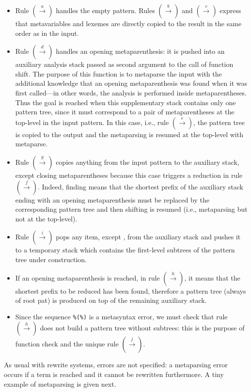 \begin{itemize}

  \item Rule \((\xrightarrow{a})\) handles the empty pattern. Rules
    \((\xrightarrow{b})\) and \((\xrightarrow{c})\) express that
    meta\-variables and lexemes are directly copied to the result in
    the same order as in the input.

  \item Rule \((\xrightarrow{d})\) handles an opening
    meta\-parenthesis: it is pushed into an auxiliary analysis stack
    passed as second argument to the call of function
    \textsf{shift}. The purpose of this function is to metaparse the
    input with the additional knowledge that an opening
    meta\-parenthesis was found when it was first called---in other
    words, the analysis is performed inside meta\-parentheses. Thus
    the goal is reached when this supplementary stack contains only
    one pattern tree, since it must correspond to a pair of
    meta\-parentheses at the top\hyp{}level in the input pattern. In
    this case, i.e., rule \((\xrightarrow{e})\), the pattern tree is
    copied to the output and the meta\-parsing is resumed at the
    top\hyp{}level with \textsf{metaparse}.

  \item Rule \((\xrightarrow{g})\) copies anything from the input
    pattern to the auxiliary stack, except closing meta\-parentheses
    because this case triggers a reduction in rule
    \((\xrightarrow{f})\). Indeed, finding \mrp means that the
    shortest prefix of the auxiliary stack ending with an opening
    meta\-parenthesis must be replaced by the corresponding pattern
    tree and then shifting is resumed (i.e., meta\-parsing but not at
    the top\hyp{}level). 

  \item Rule \((\xrightarrow{i})\) pops any item, except \mlp, from
    the auxiliary stack and pushes it to a temporary stack which
    contains the first\hyp{}level subtrees of the pattern tree under
    construction.

  \item If an opening meta\-parenthesis is reached, in rule
    \((\xrightarrow{h})\), it means that the shortest prefix to be
    reduced has been found, therefore a pattern tree (always of root
    \textsf{pat}) is produced on top of the remaining auxiliary stack.

    \item Since the sequence \texttt{\%(\%)} is a meta\-syntax error,
      we must check that rule \((\xrightarrow{h})\) does not build a
      pattern tree without subtrees: this is the purpose of function
      \textsf{check} and the unique rule \((\xrightarrow{j})\).

\end{itemize}
As usual with rewrite systems, errors are not specified: a
meta\-parsing error occurs if a term is reached and it cannot be
rewritten furthermore. A tiny example of meta\-parsing is given next.


